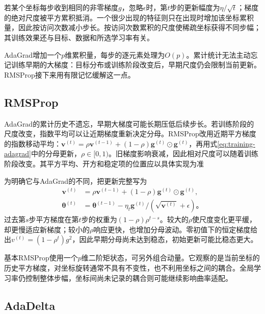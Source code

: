 若某个坐标每步收到相同的非零梯度$g$，忽略$\epsilon$时，第$t$步的更新幅度为$\eta/\sqrt t$；梯度的绝对尺度被平方累积抵消。一个很少出现的特征则只在出现时增加该坐标累积量，因此按访问次数减小步长。按访问次数累积的尺度使稀疏坐标获得不同步幅；其训练效果还与目标、数据和所选学习率有关。

AdaGrad增加一个$p$维累积量，每步的逐元素处理为$O(p)$。累计统计无法主动忘记训练早期的大梯度：目标分布或训练阶段改变后，早期尺度仍会限制当前更新。RMSProp接下来用有限记忆缓解这一点。

\subsection{RMSProp}
\label{sec:training-rmsprop}

AdaGrad的累计历史不遗忘，早期大梯度可能长期压低后续步长。若训练阶段的尺度改变，指数平均可以让近期梯度重新决定分母。RMSProp改用近期平方梯度的指数移动平均：$\bm v^{(t)}=\rho\bm v^{(t-1)}+(1-\rho)\bm g^{(t)}\odot\bm g^{(t)}$，再用式\eqref{eq:training-adagrad}中的分母更新，$\rho\in[0,1)$。旧梯度影响衰减，因此相对尺度可以随着训练阶段改变。其平方平均、开方和稳定项的位置应以具体实现为准

为明确它与AdaGrad的不同，把更新完整写为
\begin{equation}
  \begin{aligned}
  \bm v^{(t)}&=\rho\bm v^{(t-1)}+(1-\rho)\bm g^{(t)}\odot\bm g^{(t)},\\
  \bm\theta^{(t)}&=\bm\theta^{(t-1)}-
    \eta_t\bm g^{(t)}/(\sqrt{\bm v^{(t)}}+\epsilon)\text{。}
  \end{aligned}
  \label{eq:training-rmsprop}
\end{equation}
过去第$s$步平方梯度在第$t$步的权重为$(1-\rho)\rho^{t-s}$。较大的$\rho$使尺度变化更平缓，却更慢适应新梯度；较小的$\rho$响应更快，也增加分母波动。零初值下的恒定梯度给出$v^{(t)}=(1-\rho^t)g^2$，因此早期分母尚未达到稳态，初始更新可能比稳态更大。

基本RMSProp使用一个$p$维二阶矩状态，可另外组合动量。它观察的是当前坐标的历史平方梯度，对坐标旋转通常不具有不变性，也不利用坐标之间的耦合。全局学习率仍控制整体步幅，坐标间尚未记录的耦合则可能继续影响曲率适配。

\subsection{AdaDelta}
\label{sec:training-adadelta}

